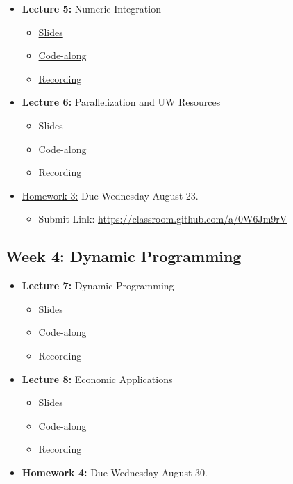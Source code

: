 \documentclass[
]{book}
\providecommand{\tightlist}{%
  \setlength{\itemsep}{0pt}\setlength{\parskip}{0pt}}
\begin{document}
\begin{itemize}
\tightlist
\item
  \textbf{Lecture 5:} Numeric Integration

  \begin{itemize}
  \tightlist
  \item
    \href{https://kevinghunt.github.io/ComputationCamp/lectures/Lecture5.html}{Slides}
  \item
    \href{https://kevinghunt.github.io/ComputationCamp/codealongs/CodeAlong5.jl}{Code-along}
  \item
    \href{https://uwmadison.zoom.us/rec/share/Rc-Mno_HDmfyakQGBhzxhbOjYIxXkX8ka4vkksy2p5Y-lxDZCJ2x08U8ja6LzMEV.54CVfkLcQhOLID_m}{Recording}
  \end{itemize}
\item
  \textbf{Lecture 6:} Parallelization and UW Resources

  \begin{itemize}
  \tightlist
  \item
    Slides
  \item
    Code-along
  \item
    Recording
  \end{itemize}
\item
  \href{https://kevinghunt.github.io/ComputationCamp/homeworks/homework3.html}{Homework 3:} Due Wednesday August 23.

  \begin{itemize}
  \tightlist
  \item
    Submit Link: \url{https://classroom.github.com/a/0W6Jm9rV}
  \end{itemize}
\end{itemize}

\hypertarget{week-4-dynamic-programming}{%
\subsection{Week 4: Dynamic Programming}\label{week-4-dynamic-programming}}

\begin{itemize}
\tightlist
\item
  \textbf{Lecture 7:} Dynamic Programming

  \begin{itemize}
  \tightlist
  \item
    Slides
  \item
    Code-along
  \item
    Recording
  \end{itemize}
\item
  \textbf{Lecture 8:} Economic Applications

  \begin{itemize}
  \tightlist
  \item
    Slides
  \item
    Code-along
  \item
    Recording
  \end{itemize}
\item
  \textbf{Homework 4:} Due Wednesday August 30.
\end{itemize}
\end{document}
